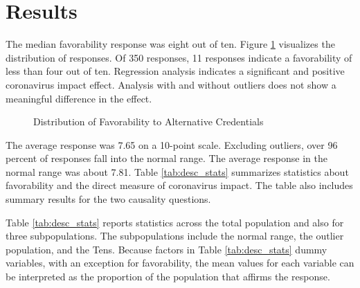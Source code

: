 \documentclass[review]{elsarticle}
\begin{document}
\section{Results}

The median favorability response was eight out of ten.
Figure \ref{fig:one} visualizes the distribution of responses.
Of 350 responses, 11 responses indicate a favorability of less than four out of ten.
Regression analysis indicates a significant and positive coronavirus impact effect.
Analysis with and without outliers does not show a meaningful difference in the effect.

\begin{figure}[h!]
    \centering
    \caption{Distribution of Favorability to Alternative Credentials}
    \label{fig:one}
\end{figure}

The average response was 7.65 on a 10-point scale.
Excluding outliers, over 96 percent of responses fall into the normal range.
The average response in the normal range was about 7.81.
Table \ref{tab:desc_stats} summarizes statistics about favorability and the direct measure of coronavirus impact.
The table also includes summary results for the two causality questions.

Table \ref{tab:desc_stats} reports statistics across the total population and also for three subpopulations.
The subpopulations include the normal range, the outlier population, and the Tens.
Because factors in Table \ref{tab:desc_stats} dummy variables,
with an exception for favorability,
the mean values for each variable can be interpreted as the proportion of the population
that affirms the response.
\end{document}
